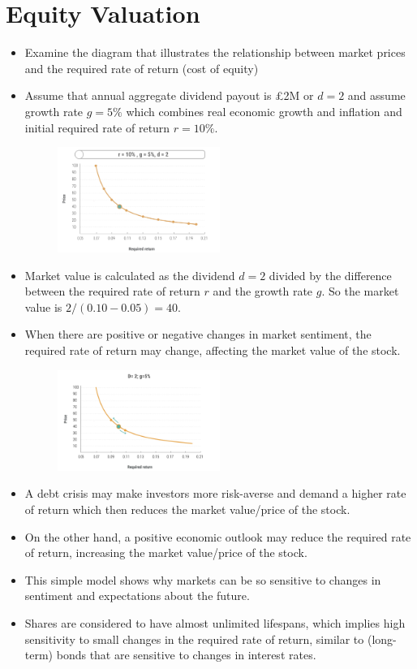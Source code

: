 \section{Equity Valuation}

\begin{itemize}
    \item Examine the diagram that illustrates the relationship between market prices and the required rate of return (cost of equity)
    \item Assume that annual aggregate dividend payout is £2M or $d=2$ and assume growth rate $g = 5\%$ which combines real economic growth and inflation and initial required rate of return $r = 10\%$.
    \begin{figure}[H]
        \centering
        \includegraphics[width=0.5\textwidth]{img/3.4.1.png}
    \end{figure}
    \item Market value is calculated as the dividend $d=2$ divided by the difference between the required rate of return $r$ and the growth rate $g$. So the market value is $2/(0.10-0.05) = 40$.
    \item When there are positive or negative changes in market sentiment, the required rate of return may change, affecting the market value of the stock.
    \begin{figure}[H]
        \centering
        \includegraphics[width=0.5\textwidth]{img/3.4.2.png}
    \end{figure}
    \item A debt crisis may make investors more risk-averse and demand a higher rate of return which then reduces the market value/price of the stock.
    \item On the other hand, a positive economic outlook may reduce the required rate of return, increasing the market value/price of the stock.
    \item This simple model shows why markets can be so sensitive to changes in sentiment and expectations about the future.
    \item Shares are considered to have almost unlimited lifespans, which implies high sensitivity to small changes in the required rate of return, similar to (long-term) bonds that are sensitive to changes in interest rates.
\end{itemize}

